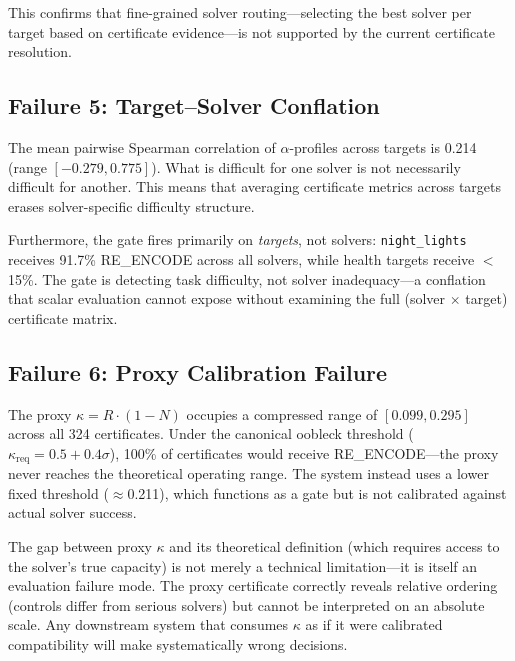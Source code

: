 \documentclass{article}
\begin{document}
This confirms that fine-grained solver routing---selecting the best solver per target based on certificate evidence---is not supported by the current certificate resolution.

\subsection{Failure 5: Target--Solver Conflation}

The mean pairwise Spearman correlation of $\alpha$-profiles across targets is 0.214 (range $[-0.279, 0.775]$). What is difficult for one solver is not necessarily difficult for another. This means that averaging certificate metrics across targets erases solver-specific difficulty structure.

Furthermore, the gate fires primarily on \emph{targets}, not solvers: \texttt{night\_lights} receives 91.7\% RE\_ENCODE across all solvers, while health targets receive $<$15\%. The gate is detecting task difficulty, not solver inadequacy---a conflation that scalar evaluation cannot expose without examining the full (solver $\times$ target) certificate matrix.

\subsection{Failure 6: Proxy Calibration Failure}

The proxy $\kappa = R \cdot (1-N)$ occupies a compressed range of $[0.099, 0.295]$ across all 324 certificates. Under the canonical oobleck threshold ($\kappa_{\text{req}} = 0.5 + 0.4\sigma$), 100\% of certificates would receive RE\_ENCODE---the proxy never reaches the theoretical operating range. The system instead uses a lower fixed threshold ($\approx$0.211), which functions as a gate but is not calibrated against actual solver success.

The gap between proxy $\kappa$ and its theoretical definition (which requires access to the solver's true capacity) is not merely a technical limitation---it is itself an evaluation failure mode. The proxy certificate correctly reveals relative ordering (controls differ from serious solvers) but cannot be interpreted on an absolute scale. Any downstream system that consumes $\kappa$ as if it were calibrated compatibility will make systematically wrong decisions.

\end{document}
